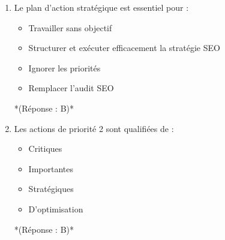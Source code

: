 \documentclass[12pt,a4paper,twoside]{report}
\begin{document}
\begin{enumerate}
    \item Le plan d'action stratégique est essentiel pour :
    \begin{itemize}
        \item[A)] Travailler sans objectif
        \item[B)] Structurer et exécuter efficacement la stratégie SEO
        \item[C)] Ignorer les priorités
        \item[D)] Remplacer l'audit SEO
    \end{itemize}
    *(Réponse : B)*

    \item Les actions de priorité 2 sont qualifiées de :
    \begin{itemize}
        \item[A)] Critiques
        \item[B)] Importantes
        \item[C)] Stratégiques
        \item[D)] D'optimisation
    \end{itemize}
    *(Réponse : B)*
\end{enumerate}
\end{document}
